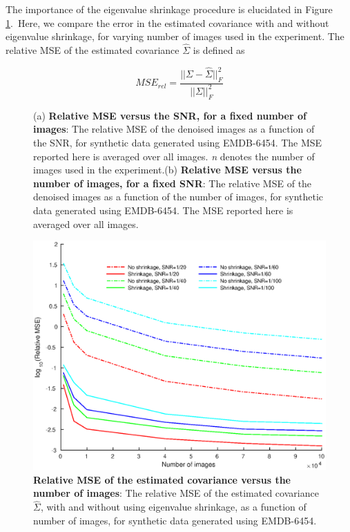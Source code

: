 \documentclass[review]{elsarticle}
\begin{document}
The importance of the eigenvalue shrinkage procedure is elucidated in Figure \ref{fig:shrinkage}.\ Here,
we compare the error in the estimated covariance with and without eigenvalue shrinkage, for 
varying number of images used in the experiment. The relative MSE of the estimated covariance $\hat{\Sigma}$ is defined as

\begin{equation}
MSE_{rel} = \frac{||\Sigma-\hat{\Sigma}||_F^2}{||\Sigma||_F^2}
\end{equation}

\begin{figure}[]
\centering
{}
\caption{(a) \textbf{Relative MSE versus the SNR, for a fixed number of images}: 
The 
relative MSE of the denoised images as a function of the SNR, for synthetic 
data 
generated using EMDB-6454. The 
MSE reported here is averaged over all images. \textit{n} denotes the number of images 
used in the experiment.(b) \textbf{Relative MSE versus the number of images, for a fixed SNR}: 
The 
relative MSE of the denoised images as a function of the number of images, for 
synthetic data generated using EMDB-6454. The 
MSE reported here is averaged over all images. }
\end{figure}


\begin{figure}
\centering

\includegraphics[width=0.9\linewidth]{cwf_shrinkage_compare.eps}

\caption{\textbf{Relative MSE of the estimated covariance versus the number of images}: 
The 
relative MSE of the estimated covariance $\hat\Sigma$, with and without using eigenvalue shrinkage, as a function of number 
of images, for synthetic 
data 
generated using EMDB-6454.}
\label{fig:shrinkage}
\end{figure}
\end{document}
